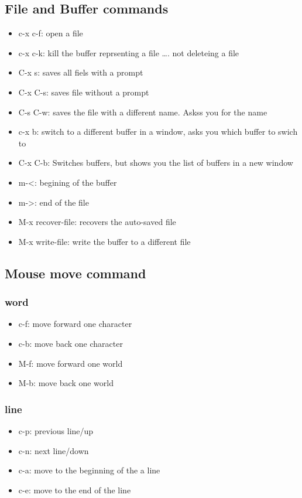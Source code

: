 \documentclass[11pt]{article}
\begin{document}
\subsection{File and  Buffer commands}
\label{sec:orge14e87e}
\begin{itemize}
\item c-x c-f: open a file
\item c-x c-k: kill the buffer reprsenting a file \ldots{}. not deleteing a file

\item C-x s: saves all fiels with a prompt
\item C-x C-s: saves file without a prompt
\item C-s C-w: saves the file with a different name. Askss you for the name

\item c-x b: switch to a different buffer in a window, asks you which buffer to swich to
\item C-x C-b: Switches buffers, but shows you the list of buffers in a new window
\end{itemize}


\begin{itemize}
\item m-<: begining of the buffer
\item m->: end of the file

\item M-x recover-file: recovers the auto-saved file
\item M-x write-file: write the buffer to a different file
\end{itemize}
\subsection{Mouse move command}
\label{sec:org745ba2a}
\subsubsection{word}
\label{sec:org7f30348}
\begin{itemize}
\item c-f: move forward one character
\item c-b: move back one character
\item M-f: move forward one world
\item M-b: move back one world
\end{itemize}
\subsubsection{line}
\label{sec:orgac9fbf8}
\begin{itemize}
\item c-p: previous line/up
\item c-n: next line/down
\item c-a: move to the beginning of the a line
\item c-e: move to the end of the line
\end{itemize}
\end{document}
